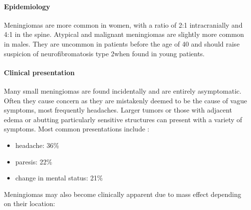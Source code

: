 \paragraph{Epidemiology}

Meningiomas are more common in women, with a ratio of 2:1 intracranially and 4:1 in the spine. Atypical and malignant meningiomas are slightly more common in males. They are uncommon in patients before the age of 40 and should raise suspicion of neurofibromatosis type 2when found in young patients.

\paragraph{Clinical presentation}

Many small meningiomas are found incidentally and are entirely asymptomatic. Often they cause concern as they are mistakenly deemed to be the cause of vague symptoms, most frequently headaches. Larger tumors or those with adjacent edema or abutting particularly sensitive structures can present with a variety of symptoms. Most common presentations include :

\begin{itemize}
	\item
	headache: 36\%
	\item
	paresis: 22\%
	\item
	change in mental status: 21\%
\end{itemize}

Meningiomas may also become clinically apparent due to mass effect depending on their location:

